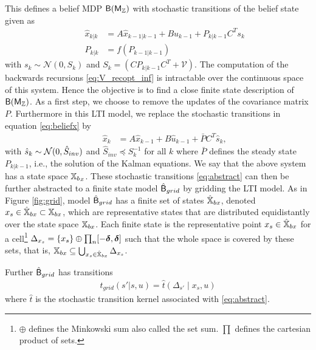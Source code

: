 \documentclass{ifacconf}
\newcommand{\new}[1]{{\color{blue}#1}}
\begin{document}
This defines a belief MDP $\mathsf{B}{(\mathsf{M}_{{\mathbb{Z}}})}$ with stochastic transitions of the belief state given as 
\begin{align}
	&&\hat x_{k|k}&=A\hat x_{k-1|k-1}+Bu_{k-1}+P_{k|k-1}C^Ts_k\label{eq:beliefx}\\
	&&P_{k|k}&=f(P_{k-1|k-1})\label{eq:beliefP}
\end{align}
with $s_k\sim \mathcal N (0, S_k )$ and  $S_k=\left(CP_{k|k-1}C^T+\mathcal V\right)$. 
\new{The computation of the backwards recursions \eqref{eq:V_recopt_inf} is intractable over the continuous space of this system. Hence the objective is to find a close finite state description of $\mathsf{B}{(\mathsf{M}_{{\mathbb{Z}}})}$.  As a first step, we choose to remove the updates of the covariance matrix $P$.  }
Furthermore in this LTI model,  we replace the stochastic transitions  in equation \eqref{eq:beliefx} by
\begin{align}  
		&&\hat x_k &=A\hat x_{k-1} +B\hat u_{k-1} + \bar P  C^T  \hat{s}_k,\label{eq:abstract} 
\end{align}
with $ \hat{s}_k\sim \mathcal{N} (0,\hat{S}_{inv})$ and $\hat{S}_{inv}\preceq S_k^{-1}$ for all $k$ \new{where $\bar P$ defines the steady state $P_{k|k-1}$, i.e., the solution of the Kalman equations. We say that the above system has a state space ${{\mathbb{X}}_b}_{x}$.}
These stochastic transitions \eqref{eq:abstract} can then be further abstracted to a finite state model $\hat{\mathsf{B}}_{grid}$ by gridding the LTI model.
As in Figure \ref{fig:grid}, model  $\hat{\mathsf{B}}_{grid}$ has a finite set of states $ \hat {{\mathbb{X}}}_{bx}$, denoted $x_s\in \hat {{\mathbb{X}}}_{bx}\subset  {{\mathbb{X}}}_{bx}$,  which are representative states that are distributed  equidistantly over the state space $  {{\mathbb{X}}}_{bx}$.   
Each finite state is the representative point $x_s\in  \hat {{\mathbb{X}}}_{bx}$ for a cell\footnote{$\oplus$ defines the  Minkowski sum also called the set sum. $\prod$ defines the cartesian product of sets.}
 $\Delta_{x_s}=\{x_s\} \oplus \prod_n [-\boldsymbol{\delta}, \boldsymbol{\delta}]$ such that the whole space is covered by these sets, that is, ${{\mathbb{X}}}_{bx} \subseteq \bigcup_{x_s\in \hat {{\mathbb{X}}}_{bx}}\Delta_{x_s}$.


Further $\hat{\mathsf{B}}_{grid}$  has transitions 
\begin{align}\label{eq:tgrid}
t_{grid}(s'|s,u)=\hat t \left(\Delta_{s'}\mid x_s, u\right)
\end{align}where $\hat t$ is the stochastic transition kernel associated with \eqref{eq:abstract}.
\end{document}
